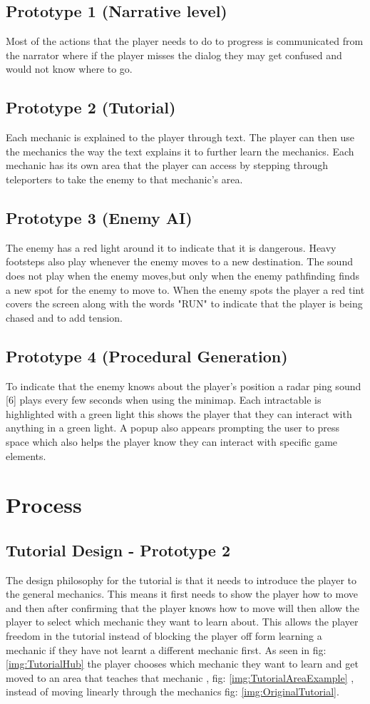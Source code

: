 \documentclass{article}
\begin{document}
\subsection{Prototype 1 (Narrative level)}
Most of the actions that the player needs to do to progress is communicated from the narrator where if the
player misses the dialog they may get confused and would not know where to go.
\subsection{Prototype 2 (Tutorial)}
Each mechanic is explained to the player through text. The player can then use the mechanics the way the
text explains it to further learn the mechanics. Each mechanic has its own area that the player can access
by stepping through teleporters to take the enemy to that mechanic's area.
\subsection{Prototype 3 (Enemy AI)}
The enemy has a red light around it to indicate that it is dangerous. Heavy footsteps also play whenever
the enemy moves to a new destination. The sound does not play when the enemy moves,but only when the
enemy pathfinding finds a new spot for the enemy to move to.
When the enemy spots the player a red tint covers the screen along with the words "RUN" to indicate that
the player is being chased and to add tension.
\subsection{Prototype 4 (Procedural Generation)}
To indicate that the enemy knows about the player's position a radar ping sound [6] plays every
few seconds when using the minimap.
Each intractable is highlighted with a green light this shows the player that
they can interact with anything in a green light. A popup also appears prompting the user to press space which
also helps the player know they can interact with specific game elements.


\section{Process}
\subsection{Tutorial Design - Prototype 2}
The design philosophy for the tutorial is that it needs to introduce the player to the general mechanics.
This means it first needs to show the player how to move and then after confirming that the player knows how
to move will then allow the player to select which mechanic they want to learn about. This allows the player
freedom in the tutorial instead of blocking the player off form learning a mechanic if they have not learnt a
different mechanic first. As seen in fig: \ref{img:TutorialHub} the player chooses which mechanic they want to learn
and get moved to an area that teaches that mechanic , fig: \ref{img:TutorialAreaExample} , instead of moving linearly through the
mechanics fig: \ref{img:OriginalTutorial}.
\end{document}
